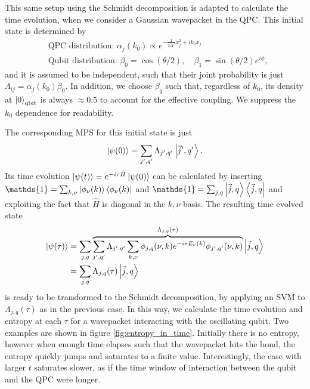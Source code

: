 \documentclass{article}
\newcommand{\Id}{\mathds{1}}
\begin{document}
This same setup using the Schmidt decomposition is adapted to calculate the time evolution, when we consider a Gaussian wavepacket in the QPC. This initial state is determined by 
\begin{align}
    & \text{QPC distribution: } \alpha_j(k_0) \propto e^{-\frac{1}{2\Delta^2}x_j^2 + i k_0x_j} \\
    & \text{Qubit distribution: } \beta_0 = \cos(\theta/2), \quad \beta_1 = \sin(\theta/2) e^{i\phi},
\end{align}
and it is assumed to be independent, such that their joint probability is just $\Lambda_{i j} = \alpha_j(k_0) \beta_0$. In addition, we choose $\beta_q$ such that, regardless of $k_0$, its density at $\ket{0}_{\rm{qbit}}$ is always $\approx 0.5$ to account for the effective coupling. We suppress the $k_0$ dependence for readability.

The corresponding MPS for this initial state is just
\begin{align}
    \ket{\psi(0)} = \sum_{j^{\prime},q^{\prime}} \Lambda_{j^{\prime},q^{\prime}} \ket{\vec{j}^{\prime},q^{\prime}}.
\end{align}
Its time evolution $\ket{\psi(t)} = e^{-i\tau \hat{H}}\ket{\psi(0)}$ can be calculated by inserting $\Id = \sum_{k,\nu}\ket{\phi_\nu (k)}\bra{\phi_\nu (k)}$ and $\Id = \sum_{j,q} \ket{\vec{j},q} \bra{\vec{j},q}$ and exploiting the fact that $\hat{H}$ is diagonal in the $k, \nu$ basis. The resulting time evolved state
\begin{align}\label{eq:mps_wavepacket}
    \ket{\psi(\tau)} & = \sum_{j,q} \overbrace{\sum_{j^{\prime}, q^{\prime}} \Lambda_{j^{\prime},q^{\prime}} \sum_{k,\nu} \phi_{j,q}(\nu,k) e^{-i\tau E_\nu (k)} \phi_{j^{\prime},q^{\prime}}(\nu,k)}^{\Lambda_{j,q} (\tau)} \ket{\vec{j},q} \nonumber \\
     & = \sum_{j,q} \Lambda_{j,q} (\tau) \ket{\vec{j},q}
\end{align}
is ready to be transformed to the Schmidt decomposition, by applying an SVM to $\Lambda_{j,q} (\tau)$ as in the previous case. In this way, we calculate the time evolution and entropy at each $\tau$ for a wavepacket interacting with the oscillating qubit. Two examples are shown in figure \ref{fig:entropy_in_time}. Initially there is no entropy, however when enough time elapses such that the wavepacket hits the bond, the entropy quickly jumps and saturates to a finite value. Interestingly, the case with larger $t$ saturates slower, as if the time window of interaction between the qubit and the QPC were longer. 
\end{document}
